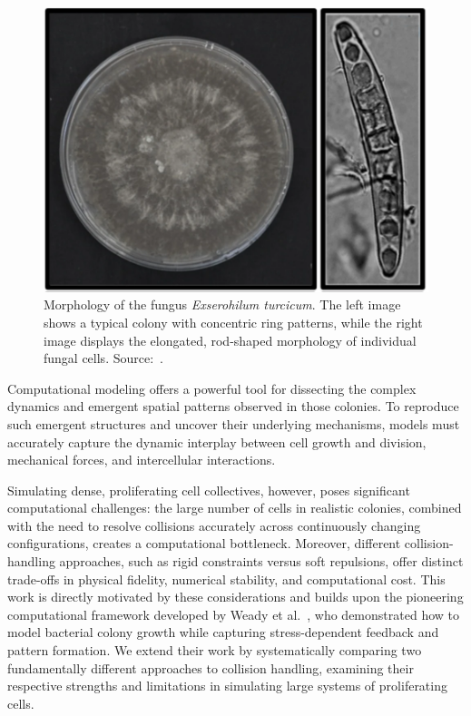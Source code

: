 \documentclass[conference]{IEEEtran}
\begin{document}
\begin{figure}[t]
    \centering
    \includegraphics[width=\linewidth]{figures/real-bacteria/Exserohilum turcicum.png}
    \caption{Morphology of the fungus \textit{Exserohilum turcicum}. The left image shows a typical colony with concentric ring patterns, while the right image displays the elongated, rod-shaped morphology of individual fungal cells. Source:~\cite{Bankole2023}.}
    \label{fig:exserohilum_turcicum}
\end{figure}

Computational modeling offers a powerful tool for dissecting the complex dynamics and emergent spatial patterns observed in those colonies. To reproduce such emergent structures and uncover their underlying mechanisms, models must accurately capture the dynamic interplay between cell growth and division, mechanical forces, and intercellular interactions.

Simulating dense, proliferating cell collectives, however, poses significant computational challenges: the large number of cells in realistic colonies, combined with the need to resolve collisions accurately across continuously changing configurations, creates a computational bottleneck. Moreover, different collision-handling approaches, such as rigid constraints versus soft repulsions, offer distinct trade-offs in physical fidelity, numerical stability, and computational cost. This work is directly motivated by these considerations and builds upon the pioneering computational framework developed by Weady et al.~\cite{Weady2024}, who demonstrated how to model bacterial colony growth while capturing stress-dependent feedback and pattern formation. We extend their work by systematically comparing two fundamentally different approaches to collision handling, examining their respective strengths and limitations in simulating large systems of proliferating cells.
\end{document}
